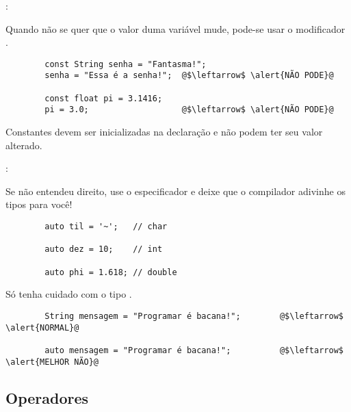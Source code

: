 \begin{frame}[fragile]{\insertsection: \insertsubsection}

	Quando não se quer que o valor duma variável mude, pode-se usar o modificador \texttt{}.
	\begin{verbatim}
		const String senha = "Fantasma!";
		senha = "Essa é a senha!";  @$\leftarrow$ \alert{NÃO PODE}@

		const float pi = 3.1416;
		pi = 3.0;                   @$\leftarrow$ \alert{NÃO PODE}@
	\end{verbatim}

	Constantes devem ser inicializadas na declaração e não podem ter seu valor alterado.

\end{frame}


\begin{frame}[fragile]{\insertsection: \insertsubsection}

	Se não entendeu direito, use o especificador \texttt{} e deixe que o compilador adivinhe os tipos para você!
	\begin{verbatim}
		auto til = '~';   // char

		auto dez = 10;    // int

		auto phi = 1.618; // double
	\end{verbatim}

	\pause
	\bigskip
	Só tenha cuidado com o tipo \texttt{}.
	\begin{verbatim}
		String mensagem = "Programar é bacana!";        @$\leftarrow$ \alert{NORMAL}@

		auto mensagem = "Programar é bacana!";          @$\leftarrow$ \alert{MELHOR NÃO}@
	\end{verbatim}

\end{frame}


\subsection{Operadores}


